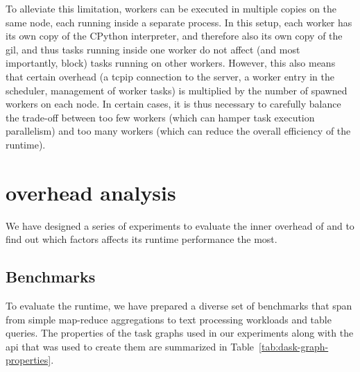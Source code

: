 To alleviate this limitation, \dask{} workers can be executed in multiple
copies on the same node, each running inside a separate process. In this setup, each worker has its
own copy of the CPython interpreter, and therefore also its own copy of the
\gls{gil}, and thus tasks running inside one worker do not affect (and most
importantly, block) tasks running on other workers. However, this also means that certain overhead
(a \gls{tcpip} connection to the server, a worker entry in the scheduler,
management of worker tasks) is multiplied by the number of spawned workers on each node. In certain
cases, it is thus necessary to carefully balance the trade-off between too few workers (which can
hamper task execution parallelism) and too many workers (which can reduce the overall efficiency of
the \dask{} runtime).

\section{\dask{} overhead analysis}
\label{sec:rsds-dask-overhead-analysis}
We have designed a series of experiments to evaluate the inner overhead of
\dask{} and to find out which factors affects its runtime performance the most.

\subsection*{Benchmarks}
To evaluate the runtime, we have prepared a diverse set of benchmarks that span from simple
map-reduce aggregations to text processing workloads and table queries. The properties of the task
graphs used in our experiments along with the \dask{}
\gls{api} that was used to create them are summarized in
Table~\ref{tab:dask-graph-properties}.

